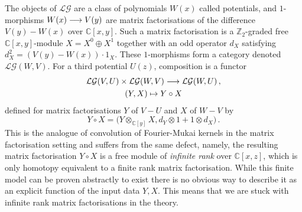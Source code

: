 \documentclass[english,letter paper,12pt,leqno]{article}
\theoremstyle{example}
\numberwithin{equation}{section}
\def\LG{\mathcal{LG}}
\def\be{\begin{equation}}
\def\ee{\end{equation}}
\def\nZ{\mathds{Z}}
\def\nC{\mathds{C}}
\begin{document}
The objects of $\LG$ are a class of polynomials $W(x)$ called potentials, and $1$-morphisms $W(x) \longrightarrow V(y)$ are matrix factorisations of the difference $V(y) - W(x)$ over $\nC[x,y]$. Such a matrix factorisation is a $\nZ_2$-graded free $\nC[x,y]$-module $X = X^0 \oplus X^1$ together with an odd operator $d_X$ satisfying $d_X^2 = (V(y) - W(x)) \cdot 1_X$. These $1$-morphisms form a category denoted $\LG(W,V)$. For a third potential $U(z)$, composition is a functor
\begin{gather*}
\LG(V,U) \times \LG(W,V) \lto \LG(W,U)\,,\\
(Y , X) \mapsto Y \circ X
\end{gather*}
defined for matrix factorisations $Y$ of $V - U$ and $X$ of $W - V$ by
\be
Y \circ X = \big( Y \otimes_{\nC[y]} X, d_Y \otimes 1 + 1 \otimes d_X \big)\,.
\ee
This is the analogue of convolution of Fourier-Mukai kernels in the matrix factorisation setting and suffers from the same defect, namely, the resulting matrix factorisation $Y \circ X$ is a free module of \emph{infinite rank} over $\nC[x,z]$, which is only homotopy equivalent to a finite rank matrix factorisation. While this finite model can be proven abstractly to exist \cite{dm1102.2957} there is no obvious way to describe it as an explicit function of the input data $Y,X$. This means that we are stuck with infinite rank matrix factorisations in the theory.
\end{document}
